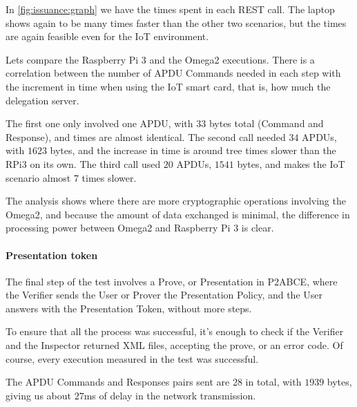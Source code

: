 \documentclass[journal]{IEEEtran}
\begin{document}

In \autoref{fig:issuance:graph} we have the times spent in each REST call. The laptop shows again to be many times faster than the other two scenarios, but the times are again feasible even for the IoT environment.

Lets compare the Raspberry Pi 3 and the Omega2 executions. There is a correlation between the number of APDU Commands needed in each step with the increment in time when using the IoT smart card, that is, how much the delegation server.

The first one only involved one APDU, with $33$ bytes total (Command and Response), and times are almost identical. The second call needed $34$ APDUs, with $1623$ bytes, and the increase in time is around tree times slower than the RPi3 on its own. The third call used $20$ APDUs, $1541$ bytes, and makes the IoT scenario almost 7 times slower.

The analysis shows where there are more cryptographic operations involving the Omega2, and because the amount of data exchanged is minimal, the difference in processing power between Omega2 and Raspberry Pi 3 is clear.



\paragraph{Presentation token}\hfil

The final step of the test involves a Prove, or Presentation in P2ABCE, where the Verifier sends the User or Prover the Presentation Policy, and the User answers with the Presentation Token, without more steps. 

To ensure that all the process was successful, it's enough to check if the Verifier and the Inspector returned XML files, accepting the prove, or an error code. Of course, every execution measured in the test was successful.

The APDU Commands and Responses pairs sent are $28$ in total, with $1939$ bytes, giving us about $27$ms of delay in the network transmission.
\end{document}
